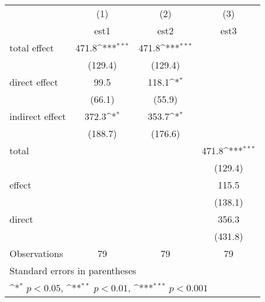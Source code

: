 {
\def\sym#1{\ifmmode^{#1}\else\(^{#1}\)\fi}
\begin{tabular}{l*{3}{c}}
\hline\hline
                &\multicolumn{1}{c}{(1)}         &\multicolumn{1}{c}{(2)}         &\multicolumn{1}{c}{(3)}         \\
                &     est1         &     est2         &     est3         \\
\hline
total effect            &    471.8\sym{***}&    471.8\sym{***}&                  \\
                &  (129.4)         &  (129.4)         &                  \\
direct effect           &     99.5         &    118.1\sym{*}  &                  \\
                &   (66.1)         &   (55.9)         &                  \\
indirect effect         &    372.3\sym{*}  &    353.7\sym{*}  &                  \\
                &  (188.7)         &  (176.6)         &                  \\
total           &                  &                  &    471.8\sym{***}\\
                &                  &                  &  (129.4)         \\
effect          &                  &                  &    115.5         \\
                &                  &                  &  (138.1)         \\
direct          &                  &                  &    356.3         \\
                &                  &                  &  (431.8)         \\
\hline
Observations    &       79         &       79         &       79         \\
\hline\hline
\multicolumn{4}{l}{\footnotesize Standard errors in parentheses}\\
\multicolumn{4}{l}{\footnotesize \sym{*} \(p<0.05\), \sym{**} \(p<0.01\), \sym{***} \(p<0.001\)}\\
\end{tabular}
}
